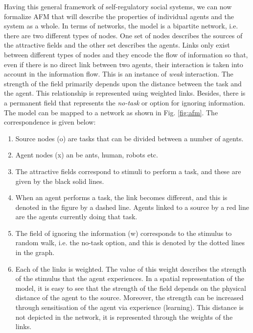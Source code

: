 \documentclass{intech}
\begin{document}
Having this general framework of self-regulatory social systems, we can now formalize AFM that will describe the properties of individual  agents and the system as a whole. In terms of networks, the model is a bipartite network, i.e. there are two different types of nodes. One set of nodes describes the sources of the attractive fields and the other set describes the agents. Links only exist between different types of nodes and they encode the flow of information so that, even if there is no direct link between two agents, their interaction is taken into account in the information flow. This is an instance of {\em weak} interaction. The strength of the field primarily depends upon the distance between the task and the agent. This relationship is represented using weighted links. Besides, there is a permanent field that represents the {\em no-task} or  option for ignoring information. The model can be mapped to a network as shown in Fig. \ref{fig:afm}. The correspondence is given below:
\begin{enumerate}
\item Source nodes (o) are tasks that can be divided between a number of agents.
\item Agent nodes (x) an be ants, human,  robots etc.
\item The attractive fields correspond to stimuli to perform a task, and these are given by the black solid lines.
\item When an agent performs a task, the link becomes different, and this is denoted in the figure by a dashed line. Agents linked to a source by a red line are the agents currently doing that task. 
\item The field of ignoring the information (w) corresponds to the stimulus to random walk, i.e. the no-task option, and this is denoted by the dotted lines in the graph. 
\item Each of the links is weighted. The value of this weight describes the strength of the stimulus that the agent experiences. In a spatial representation of the model, it is easy to see that the strength of the field depends on the physical distance of the agent to the source. Moreover, the strength can be increased through sensitisation of the agent via experience (learning). This distance is not depicted in the network, it is represented through the weights of the links. %
\end{enumerate}
\end{document}
